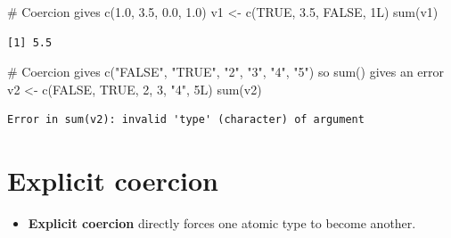 \documentclass[
  letterpaper,
  DIV=11,
  numbers=noendperiod]{scrreprt}
\newenvironment{Shaded}{\begin{snugshade}}{\end{snugshade}}
\newcommand{\CommentTok}[1]{\textcolor[rgb]{0.37,0.37,0.37}{#1}}
\newcommand{\ConstantTok}[1]{\textcolor[rgb]{0.56,0.35,0.01}{#1}}
\newcommand{\DecValTok}[1]{\textcolor[rgb]{0.68,0.00,0.00}{#1}}
\newcommand{\FloatTok}[1]{\textcolor[rgb]{0.68,0.00,0.00}{#1}}
\newcommand{\FunctionTok}[1]{\textcolor[rgb]{0.28,0.35,0.67}{#1}}
\newcommand{\NormalTok}[1]{\textcolor[rgb]{0.00,0.23,0.31}{#1}}
\newcommand{\OtherTok}[1]{\textcolor[rgb]{0.00,0.23,0.31}{#1}}
\newcommand{\StringTok}[1]{\textcolor[rgb]{0.13,0.47,0.30}{#1}}
\providecommand{\tightlist}{%
  \setlength{\itemsep}{0pt}\setlength{\parskip}{0pt}}\usepackage{longtable,booktabs,array}
\begin{document}
\begin{tcolorbox}[enhanced jigsaw, colbacktitle=quarto-callout-tip-color!10!white, opacitybacktitle=0.6, breakable, left=2mm, leftrule=.75mm, toprule=.15mm, toptitle=1mm, bottomtitle=1mm, colframe=quarto-callout-tip-color-frame, opacityback=0, coltitle=black, arc=.35mm, titlerule=0mm, colback=white, bottomrule=.15mm, title=\textcolor{quarto-callout-tip-color}{\faLightbulb}\hspace{0.5em}{Answer}, rightrule=.15mm]

\begin{Shaded}
\begin{Highlighting}[]
\CommentTok{\# Coercion gives c(1.0, 3.5, 0.0, 1.0)}
\NormalTok{v1 }\OtherTok{\textless{}{-}} \FunctionTok{c}\NormalTok{(}\ConstantTok{TRUE}\NormalTok{, }\FloatTok{3.5}\NormalTok{, }\ConstantTok{FALSE}\NormalTok{, }\DecValTok{1}\NormalTok{L)}
\FunctionTok{sum}\NormalTok{(v1)}
\end{Highlighting}
\end{Shaded}

\begin{verbatim}
[1] 5.5
\end{verbatim}

\begin{Shaded}
\begin{Highlighting}[]
\CommentTok{\# Coercion gives c("FALSE", "TRUE", "2", "3", "4", "5") so sum() gives an error}
\NormalTok{v2 }\OtherTok{\textless{}{-}} \FunctionTok{c}\NormalTok{(}\ConstantTok{FALSE}\NormalTok{, }\ConstantTok{TRUE}\NormalTok{, }\DecValTok{2}\NormalTok{, }\DecValTok{3}\NormalTok{, }\StringTok{"4"}\NormalTok{, }\DecValTok{5}\NormalTok{L)}
\FunctionTok{sum}\NormalTok{(v2)}
\end{Highlighting}
\end{Shaded}

\begin{verbatim}
Error in sum(v2): invalid 'type' (character) of argument
\end{verbatim}

\end{tcolorbox}

\section{Explicit coercion}\label{explicit-coercion}

\begin{itemize}
\tightlist
\item
  \textbf{Explicit coercion} directly forces one atomic type to become
  another.
\end{itemize}
\end{document}

